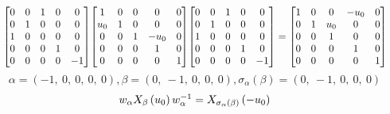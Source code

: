 \documentclass[11pt]{article}
\theoremstyle{definition}
\begin{document}
\[
\scaletoalign{\textwidth}{{\left[\begin{matrix}0 & 0 & 1 & 0 & 0\\0 & 1 & 0 & 0 & 0\\1 & 0 & 0 & 0 & 0\\0 & 0 & 0 & 1 & 0\\0 & 0 & 0 & 0 & -1\end{matrix}\right]} {\left[\begin{matrix}1 & 0 & 0 & 0 & 0\\u_{0} & 1 & 0 & 0 & 0\\0 & 0 & 1 & - u_{0} & 0\\0 & 0 & 0 & 1 & 0\\0 & 0 & 0 & 0 & 1\end{matrix}\right]} {\left[\begin{matrix}0 & 0 & 1 & 0 & 0\\0 & 1 & 0 & 0 & 0\\1 & 0 & 0 & 0 & 0\\0 & 0 & 0 & 1 & 0\\0 & 0 & 0 & 0 & -1\end{matrix}\right]} = {\left[\begin{matrix}1 & 0 & 0 & - u_{0} & 0\\0 & 1 & u_{0} & 0 & 0\\0 & 0 & 1 & 0 & 0\\0 & 0 & 0 & 1 & 0\\0 & 0 & 0 & 0 & 1\end{matrix}\right]}}
\]
\[
\alpha = \left( -1, \  0, \  0, \  0, \  0\right), \beta = \left( 0, \  -1, \  0, \  0, \  0\right), \sigma_{\alpha}(\beta) = \left( 0, \  -1, \  0, \  0, \  0\right)
\]
\[
\scaletoalign{\textwidth}{w_{\alpha} X_{\beta}\left(u_{0}\right) w_{\alpha}^{-1} = X_{\sigma_{\alpha}\left(\beta\right)}\left(- u_{0}\right)}
\]
\end{document}
